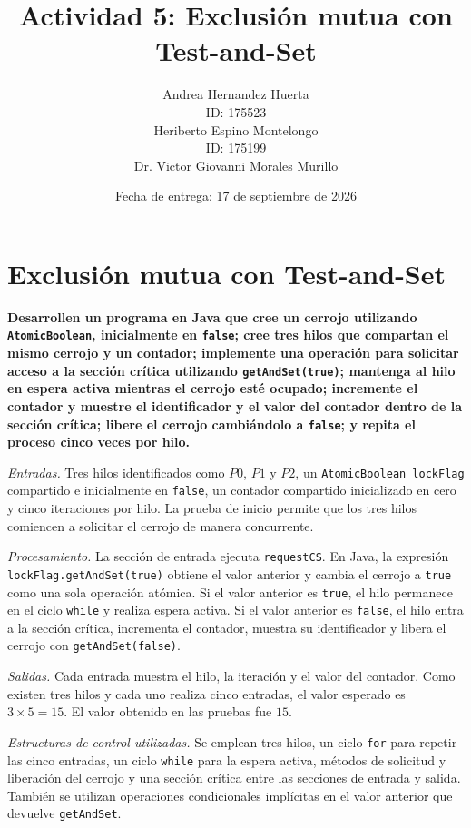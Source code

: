 \documentclass[12pt,oneside]{template/liverpoolthesis}
\title{Actividad 5: Exclusión mutua con Test-and-Set}
\author{%
  Andrea Hernandez Huerta\\
  ID: 175523\\[1em]
  Heriberto Espino Montelongo\\
  ID: 175199\\[1em]
  \text{Profesor:} Dr. Victor Giovanni Morales Murillo}
\date{Fecha de entrega: 17 de septiembre de 2026}
\begin{document}
\frontmatter
\maketitle
\tableofcontents
\listoffigures

\mainmatter

\chapter{Exclusión mutua con Test-and-Set}

\textbf{Desarrollen un programa en Java que cree un cerrojo utilizando
\texttt{AtomicBoolean}, inicialmente en \texttt{false}; cree tres hilos que
compartan el mismo cerrojo y un contador; implemente una operación para
solicitar acceso a la sección crítica utilizando \texttt{getAndSet(true)};
mantenga al hilo en espera activa mientras el cerrojo esté ocupado; incremente
el contador y muestre el identificador y el valor del contador dentro de la
sección crítica; libere el cerrojo cambiándolo a \texttt{false}; y repita el
proceso cinco veces por hilo.}

\emph{Entradas.} Tres hilos identificados como $P0$, $P1$ y $P2$, un
\texttt{AtomicBoolean lockFlag} compartido e inicialmente en \texttt{false},
un contador compartido inicializado en cero y cinco iteraciones por hilo. La
prueba de inicio permite que los tres hilos comiencen a solicitar el cerrojo
de manera concurrente.

\emph{Procesamiento.} La sección de entrada ejecuta
\texttt{requestCS}. En Java, la expresión \texttt{lockFlag.getAndSet(true)}
obtiene el valor anterior y cambia el cerrojo a \texttt{true} como una sola
operación atómica. Si el valor anterior es \texttt{true}, el hilo permanece en
el ciclo \texttt{while} y realiza espera activa. Si el valor anterior es
\texttt{false}, el hilo entra a la sección crítica, incrementa el contador,
muestra su identificador y libera el cerrojo con \texttt{getAndSet(false)}.

\emph{Salidas.} Cada entrada muestra el hilo, la iteración y el valor del
contador. Como existen tres hilos y cada uno realiza cinco entradas, el valor
esperado es $3\times5=15$. El valor obtenido en las pruebas fue $15$.

\emph{Estructuras de control utilizadas.} Se emplean tres hilos, un ciclo
\texttt{for} para repetir las cinco entradas, un ciclo \texttt{while} para la
espera activa, métodos de solicitud y liberación del cerrojo y una sección
crítica entre las secciones de entrada y salida. También se utilizan
operaciones condicionales implícitas en el valor anterior que devuelve
\texttt{getAndSet}.
\end{document}
